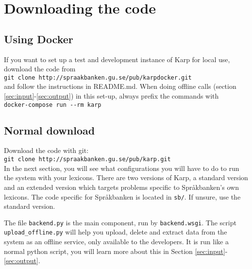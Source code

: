 \documentclass[
12pt, %
a4paper, %
oneside, %
headinclude,footinclude, %
BCOR0mm, %
]{scrartcl}
\begin{document}
\section{Downloading the code}
\label{sec:download}
\subsection*{Using Docker}
\label{sec:docker}
If you want to set up a test and development instance of Karp for local use,
download the code from\\
\verb|git clone http://spraakbanken.gu.se/pub/karpdocker.git|\\
and follow the instructions in README.md. When doing offline calls (section \ref{sec:input}-\ref{sec:output}) in this
set-up, always prefix the commands with  \\
\verb|docker-compose run --rm karp|

\subsection*{Normal download}
  Download the code with git:\\
   \verb|git clone http://spraakbanken.gu.se/pub/karp.git|\\


  In the next section, you will see what configurations you will have to do to
  run the system with your lexicons.
  There are two versions of Karp, a standard version and an extended version which targets
  problems specific to Språkbanken's own lexicons. The code specific for Språkbanken is located in
  \verb|sb/|. If unsure, use the standard version.

  The file \verb|backend.py| is the main component, run by \verb|backend.wsgi|.
  The script \verb|upload_offline.py| will help you upload, delete and extract
  data from the system as an offline service, only available to the developers.
  It is run like a normal python script, you will learn more
  about this in Section \ref{sec:input}-\ref{sec:output}.
\end{document}
